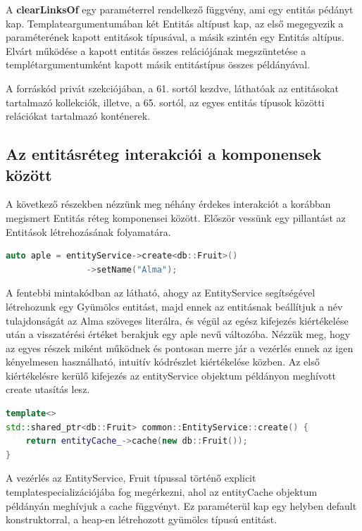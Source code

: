 A \textbf{clearLinksOf} egy paraméterrel rendelkező függvény, ami egy entitás pédányt kap. Templateargumentumában két Entitás altípust kap, az első megegyezik a paraméterének kapott entitások típusával, a másik szintén egy Entitás altípus. Elvárt működése a kapott entitás összes relációjának megszüntetése a templétargumentumként kapott másik entitástípus összes példányával.

A forráskód privát szekciójában, a 61. sortól kezdve, láthatóak az entitásokat tartalmazó kollekciók, illetve, a 65. sortól, az egyes entitás típusok közötti relációkat tartalmazó konténerek.

\subsection{Az entitásréteg interakciói a komponensek között}

A következő részekben nézzünk meg néhány érdekes interakciót a korábban megismert Entitás réteg komponensei között. Először vessünk egy pillantást az Entitások létrehozásának folyamatára.

\begin{lstlisting}[language={C++}]
auto aple = entityService->create<db::Fruit>()
                ->setName("Alma");
\end{lstlisting}

A fentebbi mintakódban az látható, ahogy az EntityService segítségével létrehozunk egy Gyümölcs entitást, majd ennek az entitásnak beállítjuk a név tulajdonságát az Alma szöveges literálra, és végül az egész kifejezés kiértékelése után a visszatérési értéket berakjuk egy aple nevű változóba. Nézzük meg, hogy az egyes részek miként működnek és pontosan merre jár a vezérlés ennek az igen kényelmesen használható, intuitív kódrészlet kiértékelése közben.
Az első kiértékelésre kerülő kifejezés az entityService objektum példányon meghívott create utasítás lesz.

\begin{lstlisting}[language={C++}]
template<>
std::shared_ptr<db::Fruit> common::EntityService::create() {
    return entityCache_->cache(new db::Fruit());
}
\end{lstlisting}

A vezérlés az EntityService, Fruit típussal történő explicit templatespecializációjába fog megérkezni, ahol az entityCache objektum példányán meghívjuk a cache függvényt. Ez paraméterül kap egy helyben default konstruktorral, a heap-en létrehozott gyümölcs típusú entitást.

